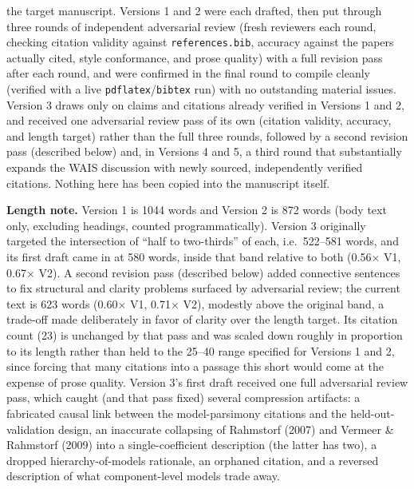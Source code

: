 \documentclass[12pt]{article}
\begin{document}
the target manuscript. Versions 1 and 2 were each
drafted, then put through three rounds of independent adversarial review
(fresh reviewers each round, checking citation validity against
\texttt{references.bib}, accuracy against the papers actually cited, style
conformance, and prose quality) with a full revision pass after each
round, and were confirmed in the final round to compile cleanly (verified
with a live \texttt{pdflatex}/\texttt{bibtex} run) with no outstanding
material issues. Version 3 draws only on claims and citations already
verified in Versions 1 and 2, and received one adversarial review pass of
its own (citation validity, accuracy, and length target) rather than the
full three rounds, followed by a second revision pass (described below)
and, in Versions 4 and 5, a third round that substantially expands the
WAIS discussion with newly sourced, independently verified citations.
Nothing here has been copied into the manuscript itself.

\noindent\textbf{Length note.} Version 1 is 1044 words and Version 2 is
872 words (body text only, excluding headings, counted programmatically).
Version 3 originally targeted the intersection of ``half to two-thirds''
of each, i.e.\ 522--581 words, and its first draft came in at 580 words,
inside that band relative to both (0.56$\times$ V1, 0.67$\times$ V2). A
second revision pass (described below) added connective sentences to fix
structural and clarity problems surfaced by adversarial review; the
current text is 623 words (0.60$\times$ V1, 0.71$\times$ V2), modestly
above the original band, a trade-off made deliberately in favor of
clarity over the length target. Its citation count (23) is unchanged by
that pass and was scaled down roughly in proportion to its length rather
than held to the 25--40 range specified for Versions 1 and 2, since
forcing that many citations into a passage this short would come at the
expense of prose quality. Version 3's first draft received one full
adversarial review pass, which caught (and that pass fixed) several
compression artifacts: a fabricated causal link between the
model-parsimony citations and the held-out-validation design, an
inaccurate collapsing of Rahmstorf (2007) and Vermeer \& Rahmstorf (2009)
into a single-coefficient description (the latter has two), a dropped
hierarchy-of-models rationale, an orphaned citation, and a reversed
description of what component-level models trade away.
\end{document}
